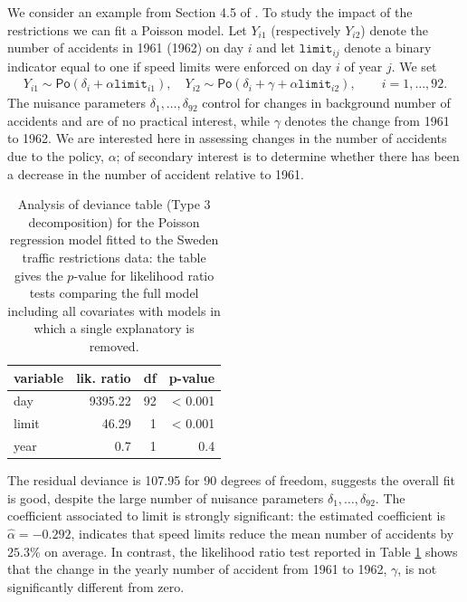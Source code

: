 \documentclass[
  11pt,
  letterpaper,
]{book}
\theoremstyle{definition}
\theoremstyle{definition}
\theoremstyle{definition}
\theoremstyle{remark}
\begin{document}
We consider an example from Section 4.5 of \citet{Brazzale/Davison/Reid:2007}.
To study the impact of the restrictions we can fit a Poisson model. Let
\(Y_{i1}\) (respectively \(Y_{i2}\)) denote the number of accidents in 1961
(1962) on day \(i\) and let \(\texttt{limit}_{ij}\) denote a binary
indicator equal to one if speed limits were enforced on day \(i\) of year
\(j\). We set
\begin{align*}
Y_{i1} \sim \mathsf{Po}(\delta_i + \alpha \texttt{limit}_{i1}), \quad Y_{i2} \sim\mathsf{Po}(\delta_i + \gamma +  \alpha \texttt{limit}_{i2}), \qquad i=1, \ldots, 92. 
\end{align*}
The nuisance parameters \(\delta_1, \ldots, \delta_{92}\) control for changes in background number of accidents and are of no practical interest, while \(\gamma\) denotes the change from 1961 to 1962. We are interested here in assessing changes in the number of accidents due to the policy, \(\alpha\); of secondary interest is to determine whether there has been a decrease in the number of accident relative to 1961.

\begin{table}

\caption{\label{tab:swedenglm}Analysis of deviance table (Type 3 decomposition) for the Poisson regression model fitted to the Sweden traffic restrictions data: the table gives the $p$-value for likelihood ratio tests comparing the full model including all covariates with models in which a single explanatory is removed.}
\centering
\begin{tabular}[t]{lrrr}
\toprule
variable & lik. ratio & df & p-value\\
\midrule
day & 9395.22 & 92 & < 0.001\\
limit & 46.29 & 1 & < 0.001\\
year & 0.7 & 1 & 0.4\\
\bottomrule
\end{tabular}
\end{table}

The residual deviance is 107.95 for 90 degrees of freedom, suggests the overall fit is good, despite the large number of nuisance parameters \(\delta_1, \ldots, \delta_{92}\). The coefficient associated to limit is strongly significant: the estimated coefficient is \(\widehat{\alpha}=-0.292\), indicates that speed limits reduce the mean number of accidents by \(25.3\)\% on average. In contrast, the likelihood ratio test reported in Table \ref{tab:swedenglm} shows that the change in the yearly number of accident from 1961 to 1962, \(\gamma\), is not significantly different from zero.
\end{document}
